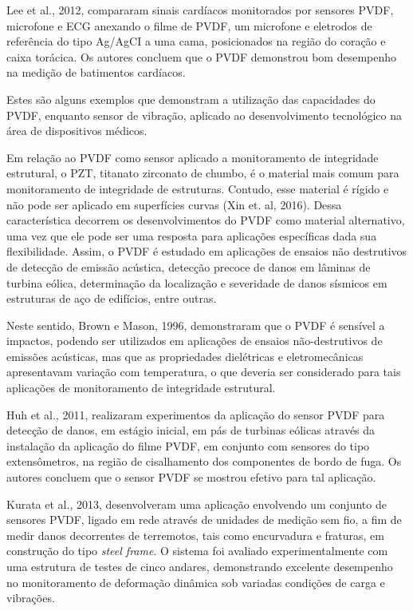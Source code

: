 \documentclass[
	12pt,				
	oneside,			
	a4paper,			
	english,			
	brazil,	
	sumario=abnt-6027-2012		
	]{abntex2ppgsi}
\begin{document}
Lee et al., 2012, compararam sinais cardíacos monitorados por sensores PVDF, microfone e ECG anexando o filme de PVDF, um microfone e eletrodos de referência do tipo Ag/AgCI a uma cama, posicionados na região do coração e caixa torácica. Os autores concluem que o PVDF demonstrou bom desempenho na medição de batimentos cardíacos. 

Estes são alguns exemplos que demonstram a utilização das capacidades do PVDF, enquanto sensor de vibração, aplicado ao desenvolvimento tecnológico na área de dispositivos médicos.

Em relação ao PVDF como sensor aplicado a monitoramento de integridade estrutural, o PZT, titanato zirconato de chumbo, é o material mais comum para monitoramento de integridade de estruturas. Contudo, esse material é rígido e não pode ser aplicado em superfícies curvas (Xin et. al, 2016). Dessa característica decorrem os desenvolvimentos do PVDF como material alternativo, uma vez que ele pode ser uma resposta para aplicações específicas dada sua flexibilidade. Assim, o PVDF é estudado em aplicações de ensaios não destrutivos de detecção de emissão acústica, detecção precoce de danos em lâminas de turbina eólica, determinação da localização e severidade de danos sísmicos em estruturas de aço de edifícios, entre outras.

Neste sentido, Brown e Mason, 1996, demonstraram que o PVDF é sensível a impactos, podendo ser utilizados em aplicações de ensaios não-destrutivos de emissões acústicas, mas que as propriedades dielétricas e eletromecânicas apresentavam variação com temperatura, o que deveria ser considerado para tais aplicações de monitoramento de integridade estrutural. 


Huh et al., 2011, realizaram experimentos da aplicação do sensor PVDF para detecção de danos, em estágio inicial, em pás de turbinas eólicas através da instalação da aplicação do filme PVDF, em conjunto com sensores do tipo extensômetros, na região de cisalhamento dos componentes de bordo de fuga. Os autores concluem que o sensor PVDF se mostrou efetivo para tal aplicação.

Kurata et al., 2013, desenvolveram uma aplicação envolvendo um conjunto de sensores PVDF, ligado em rede através de unidades de medição sem fio, a fim  de medir danos decorrentes de terremotos, tais como encurvadura e fraturas, em construção do tipo \textit{steel frame}. O sistema foi avaliado experimentalmente com uma estrutura de testes de cinco andares, demonstrando excelente desempenho no monitoramento de deformação dinâmica sob variadas condições de carga e vibrações.
\end{document}
